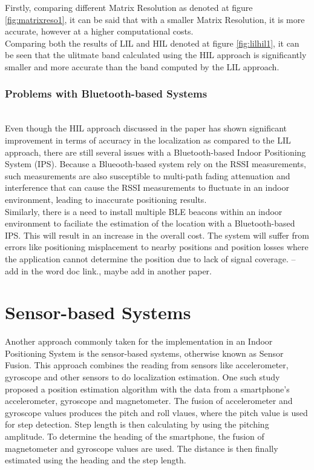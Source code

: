 \documentclass{l4proj}
\begin{document}
Firstly, comparing different Matrix Resolution as denoted at figure \ref{fig:matrixreso1}, it can be said that with a smaller Matrix Resolution, it is more accurate, however at a higher computational costs.\\
Comparing both the results of LIL and HIL denoted at figure \ref{fig:lilhil1}, it can be seen that the ulitmate band calculated using the HIL approach is significantly smaller and more accurate than the band computed by the LIL approach.\\
\subsubsection{Problems with Bluetooth-based Systems}~\\
Even though the HIL approach discussed in the paper has shown significant improvement in terms of accuracy in the localization as compared to the LIL approach, there are still several issues with a Bluetooth-based Indoor Positioning System (IPS). Because a Blueooth-based system rely on the RSSI measurements, such measurements are also susceptible to multi-path fading attenuation and interference that can cause the RSSI measurements to fluctuate in an indoor environment, leading to inaccurate positioning results.\\
Similarly, there is a need to install multiple BLE beacons within an indoor environment to faciliate the estimation of the location with a Bluetooth-based IPS. This will result in an increase in the overall cost. The system will suffer from errors like positioning misplacement to nearby positions and position losses where the application cannot determine the position due to lack of signal coverage. -- add in the word doc link., maybe add in another paper.

\section{Sensor-based Systems}
Another approach commonly taken for the implementation in an Indoor Positioning System is the sensor-based systems, otherwise known as Sensor Fusion. This approach combines the reading from sensors like accelerometer, gyroscope and other sensors to do localization estimation. One such study proposed a position estimation algorithm with the data from a smartphone's accelerometer, gyroscope and magnetometer. The fusion of accelerometer and gyroscope values produces the pitch and roll vlaues, where the pitch value is used for step detection. Step length is then calculating by using the pitching amplitude. To determine the heading of the smartphone, the fusion of magnetometer and gyroscope values are used. The distance is then finally estimated using the heading and the step length.\cite{imu}\\
\end{document}
